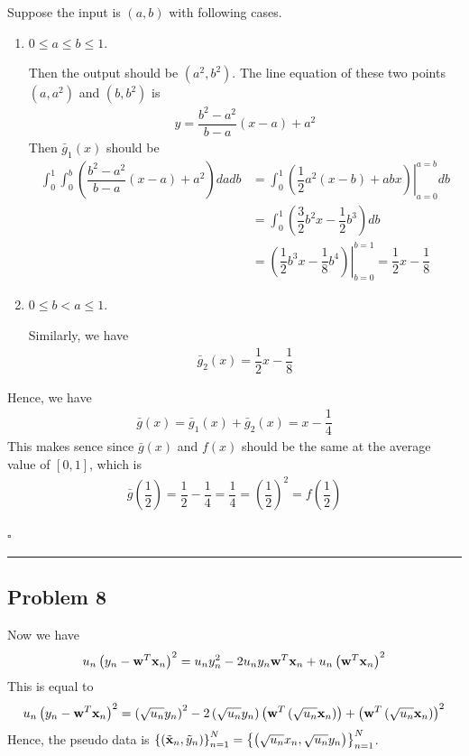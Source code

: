 \documentclass[12pt]{article}
\newcommand*{\QEDB}{\hfill\ensuremath{\square}}
\newcommand{\CBrackets}[1]{\left\{#1\right\}}
\newcommand{\SBrackets}[1]{\left[#1\right]}
\newcommand{\ParTh}[1]{\left(#1\right)}
\newcommand{\BF}[1]{{\bf#1}}
\newcommand{\horrule}[1]{\rule{\linewidth}{#1}}
\begin{document}
Suppose the input is $\ParTh{a,b}$ with following cases.
\begin{enumerate}
	\item $0\leq a\leq b\leq1$.
	
	Then the output should be $\ParTh{a^2,b^2}$. The line equation of these two points $\ParTh{a,a^2}$ and $\ParTh{b,b^2}$ is
\begin{align}
y=\dfrac{b^2-a^2}{b-a}\ParTh{x-a}+a^2
\end{align}
Then $\bar{g}_1\ParTh{x}$ should be
\begin{align}
\int_{0}^{1}\int_{0}^{b}\ParTh{\dfrac{b^2-a^2}{b-a}\ParTh{x-a}+a^2}dadb&=\int_{0}^{1}\left.\ParTh{\dfrac{1}{2}a^2\ParTh{x-b}+abx}\right|^{a=b}_{a=0}db\\
&=\int_{0}^{1}\ParTh{\dfrac{3}{2}b^2x-\dfrac{1}{2}b^3}db\\
&=\left.\ParTh{\dfrac{1}{2}b^3x-\dfrac{1}{8}b^4}\right|^{b=1}_{b=0}=\dfrac{1}{2}x-\dfrac{1}{8}
\end{align}

\item $0\leq b<a\leq1$.

Similarly, we have
\begin{align}
\bar{g}_2\ParTh{x}=\dfrac{1}{2}x-\dfrac{1}{8}
\end{align}
\end{enumerate}
Hence, we have
\begin{align}
\bar{g}\ParTh{x}=\bar{g}_1\ParTh{x}+\bar{g}_2\ParTh{x}=x-\dfrac{1}{4}
\end{align}
This makes sence since $\bar{g}\ParTh{x}$ and $f\ParTh{x}$ should be the same at the average value of $\SBrackets{0,1}$, which is
\begin{align}
\bar{g}\ParTh{\dfrac{1}{2}}=\dfrac{1}{2}-\dfrac{1}{4}=\dfrac{1}{4}=\ParTh{\dfrac{1}{2}}^2=f\ParTh{\dfrac{1}{2}}
\end{align}

\QEDB

\horrule{0.5pt}

\subsection*{Problem 8}

Now we have
\begin{align}
u_n\ParTh{y_n-\BF{w}^T\BF{x}_n}^2=u_ny^2_n-2u_ny_n\BF{w}^T\BF{x}_n+u_n\ParTh{\BF{w}^T\BF{x}_n}^2
\end{align}
This is equal to
\begin{align}
u_n\ParTh{y_n-\BF{w}^T\BF{x}_n}^2=\ParTh{\sqrt{u_n}y_n}^2-2\ParTh{\sqrt{u_n}y_n}\ParTh{\BF{w}^T\ParTh{\sqrt{u_n}\BF{x}_n}}+\ParTh{\BF{w}^T\ParTh{\sqrt{u_n}\BF{x}_n}}^2
\end{align}
Hence, the pseudo data is $\CBrackets{\ParTh{\tilde{\BF{x}}_n,\tilde{y}_n}}^N_{n=1}=\CBrackets{\ParTh{\sqrt{u_n}x_n,\sqrt{u_n}y_n}}^N_{n=1}$.
\end{document}
